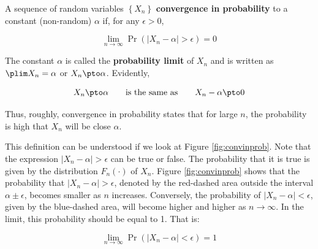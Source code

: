 \begin{definition}\label{definition:convergence_in_probability}
	A sequence of random variables $\left\{X_n\right\}$ \textbf{convergence in probability} to a constant (non-random) $\alpha$ if, for any $\epsilon>0$,
	
	\begin{equation*}
	\lim_{n\to \infty} \Pr(\left|X_n-\alpha\right|>\epsilon)=0
	\end{equation*}
	
	The constant $\alpha$ is called the \textbf{probability limit} of $X_n$ and is written as $\plim X_n=\alpha$ or $X_n\pto \alpha$. Evidently,
	
	\begin{equation*}
	X_n\pto \alpha\qquad\mbox{is the same as}\qquad X_n-\alpha\pto 0
	\end{equation*}	
\end{definition}

Thus, roughly, convergence in probability states that for large $n$, the probability is high that $X_n$ will be close $\alpha$.

This definition can be understood if we look at Figure \ref{fig:convinprob}. Note that the expression $\left|X_n-\alpha\right|>\epsilon$ can be true or false. The probability that it is true is given by the distribution $F_n(\cdot)$ of $X_n$. Figure \ref{fig:convinprob} shows that the probability that $\left|X_n-\alpha\right|>\epsilon$,  denoted by the red-dashed area outside the interval $\alpha \pm \epsilon$, becomes smaller as $n$ increases. Conversely, the probability of $\left|X_n-\alpha\right|<\epsilon$, given by the blue-dashed area, will become higher and higher as $n\to \infty$. In the limit, this probability should be equal to 1. That is:

\begin{equation*}
	\lim_{n\to \infty} \Pr(\left|X_n-\alpha\right|<\epsilon)=1
\end{equation*}

